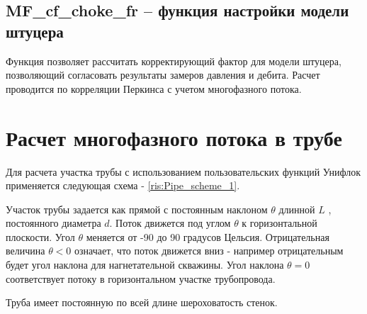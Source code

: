 

\subsection{MF\_cf\_choke\_fr – функция настройки модели штуцера}
Функция позволяет рассчитать корректирующий фактор для модели штуцера, позволяющий согласовать результаты замеров давления и дебита. Расчет проводится по корреляции Перкинса \cite{Perkins_1993} с учетом многофазного потока.  


\newpage
\section{Расчет многофазного потока в трубе}

Для расчета участка трубы с использованием пользовательских функций Унифлок применяется следующая схема - \ref{ris:Pipe_scheme_1}.

Участок трубы задается как прямой с постоянным наклоном $\theta$  длинной $L$ , постоянного диаметра $d$. Поток движется под углом $\theta$ к горизонтальной плоскости. Угол  $\theta$ меняется от -90 до 90 градусов Цельсия. Отрицательная величина  $\theta < 0 $ означает, что поток движется вниз - например отрицательным будет угол наклона для нагнетательной скважины. Угол наклона $\theta = 0 $ соответствует потоку в горизонтальном участке трубопровода.

Труба имеет постоянную по всей длине шероховатость стенок. 




